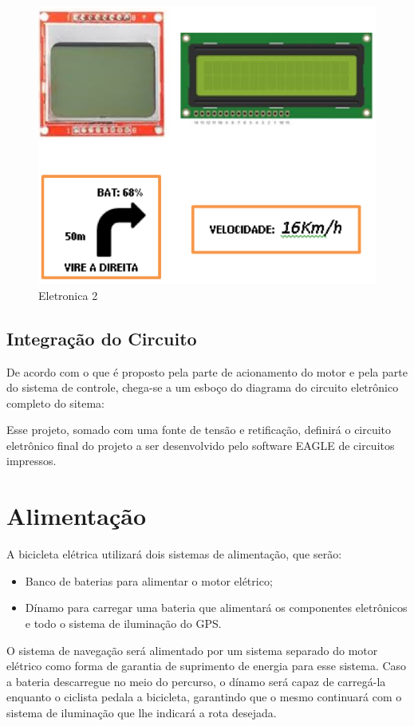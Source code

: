 \graphicspath{{figuras/}}
\begin{figure}[h!]
\centering
\includegraphics[scale=0.80]{eletronica2.png}
\caption{Eletronica 2}
\label{img:us}
\end{figure}

\subsection{Integração do Circuito}
De acordo com o que é proposto pela parte de acionamento do motor e pela parte do sistema de controle, chega-se a um esboço do diagrama do circuito eletrônico completo do sitema:

Esse projeto, somado com uma fonte de tensão e retificação, definirá o circuito eletrônico final do projeto a ser desenvolvido pelo software EAGLE de circuitos impressos.

  \section{Alimentação}
  A bicicleta elétrica utilizará dois sistemas de alimentação, que serão:
  \begin{itemize}
  	\item Banco de baterias para alimentar o motor elétrico;
  	\item Dínamo para carregar uma bateria que alimentará os componentes eletrônicos e todo o sistema de iluminação do GPS. 
  \end{itemize}
  
	O sistema de navegação será alimentado por um sistema separado do motor elétrico como forma de garantia de suprimento de energia para esse sistema. Caso a bateria descarregue no meio do percurso, o dínamo será capaz de carregá-la enquanto o ciclista pedala a bicicleta, garantindo que o mesmo continuará com o sistema de iluminação que lhe indicará a rota desejada.
	
